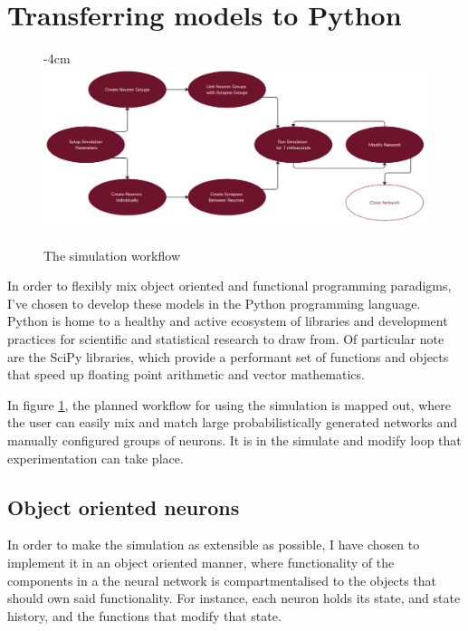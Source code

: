 
\section{Transferring models to Python}

\begin{figure}[h]
    \centering
    \addtolength{\leftskip} {-4cm}
    \addtolength{\rightskip}{-4cm}
    \includegraphics[width=1.3\linewidth]{figures/images/workflow.png}
    \caption{The simulation workflow}
    \label{fig:workflow}
\end{figure}

In order to flexibly mix object oriented and functional programming paradigms,
I've chosen to develop these models in the Python programming language. Python
is home to a healthy and active ecosystem of libraries and development practices
for scientific and statistical research to draw from. Of particular note are the
SciPy libraries, which provide a performant set of functions and objects that
speed up floating point arithmetic and vector mathematics. 

In figure \ref{fig:workflow}, the planned workflow for using the simulation is
mapped out, where the user can easily mix and match large probabilistically
generated networks and manually configured groups of neurons. It is in the
simulate and modify loop that experimentation can take place.

\subsection{Object oriented neurons}

In order to make the simulation as extensible as possible, I have chosen to
implement it in an object oriented manner, where functionality of the components
in a the neural network is compartmentalised to the objects that should own said
functionality. For instance, each neuron holds its state, and state history, and
the functions that modify that state.

